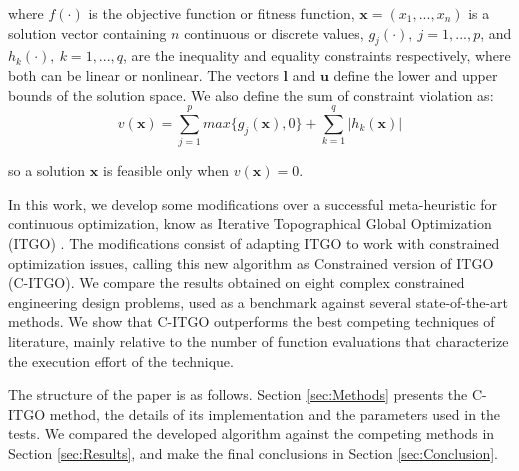 \noindent
where $f(\cdot)$ is the objective function or fitness function, $\bm{x} = (x_1, ..., x_n)$ is a solution vector containing $n$ continuous or discrete values, $g_j(\cdot), \ j = 1, ..., p$, and $h_k(\cdot), \ k = 1, ..., q$, are the inequality and equality constraints respectively, where both can be linear or nonlinear. The vectors $\bm{l}$ and $\bm{u}$ define the lower and upper bounds of the solution space. We also define the sum of constraint violation as: \\[-3em]

\begin{equation}\label{eq:viol}
    v(\bm{x}) = \sum_{j=1}^p max\{g_j(\bm{x}), 0\} + \sum_{k=1}^q |h_k(\bm{x})|
\end{equation}

\noindent
so a solution $\bm{x}$ is feasible only when $v(\bm{x}) = 0$. 

In this work, we develop some modifications over a successful meta-heuristic for continuous optimization, know as Iterative Topographical Global Optimization (ITGO) \citep{ITGO0}. The modifications consist of adapting ITGO to work with constrained optimization issues, calling this new algorithm as Constrained version of ITGO (C-ITGO). We compare the results obtained on eight complex constrained engineering design problems, used as a benchmark against several state-of-the-art methods. We show that C-ITGO outperforms the best competing techniques of literature, mainly relative to the number of function evaluations that characterize the execution effort of the technique.

The structure of the paper is as follows. Section \ref{sec:Methods} presents the C-ITGO method, the details of its implementation and the parameters used in the tests. We compared the developed algorithm against the competing methods in Section \ref{sec:Results}, and make the final conclusions in Section \ref{sec:Conclusion}.